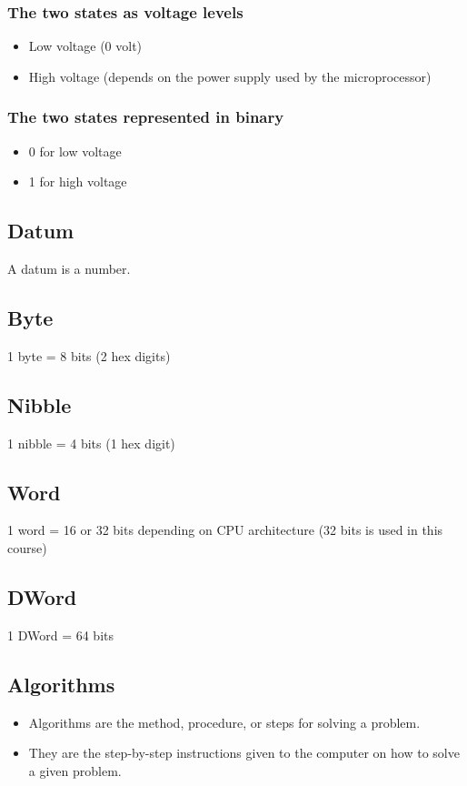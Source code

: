 \documentclass[11pt]{article}
\begin{document}
\subsubsection{The two states as voltage levels}
\label{sec:org4c95556}
\begin{itemize}
\item Low voltage (0 volt)
\item High voltage (depends on the power supply used by the microprocessor)
\end{itemize}

\subsubsection{The two states represented in binary}
\label{sec:org911155f}
\begin{itemize}
\item 0 for low voltage
\item 1 for high voltage
\end{itemize}

\subsection{Datum}
\label{sec:org7565b0b}
A datum is a number.

\subsection{Byte}
\label{sec:orgfe911a2}
1 byte = 8 bits (2 hex digits)

\subsection{Nibble}
\label{sec:orgfe8e102}
1 nibble = 4 bits (1 hex digit)

\subsection{Word}
\label{sec:org2e88422}
1 word = 16 or 32 bits depending on CPU architecture (32 bits is used in this course)

\subsection{DWord}
\label{sec:orge6b7153}
1 DWord = 64 bits

\subsection{Algorithms}
\label{sec:orgd47c681}
\begin{itemize}
\item Algorithms are the method, procedure, or steps for solving a problem.
\item They are the step-by-step instructions given to the computer on how to solve a given problem.
\end{itemize}
\end{document}
